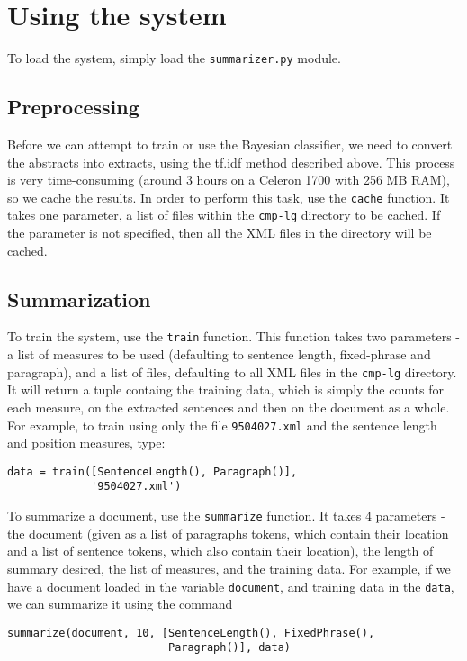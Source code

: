 \documentclass[a4paper, 10pt]{article}
\begin{document}
\section{Using the system}
To load the system, simply load the \verb|summarizer.py| module.

\subsection{Preprocessing}
Before we can attempt to train or use the Bayesian classifier, we need to convert the abstracts into extracts, using the tf.idf method described above. This process is very time-consuming (around 3 hours on a Celeron 1700 with 256 MB RAM), so we cache the results. In order to perform this task, use the \verb|cache| function. It takes one parameter, a list of files within the \verb|cmp-lg| directory to be cached. If the parameter is not specified, then all the XML files in the directory will be cached.

\subsection{Summarization}
To train the system, use the \verb|train| function. This function takes two parameters - a list of measures to be used (defaulting to sentence length, fixed-phrase and paragraph), and a list of files, defaulting to all XML files in the \verb|cmp-lg| directory. It will return a tuple containg the training data, which is simply the counts for each measure, on the extracted sentences and then on the document as a whole. For example, to train using only the file \verb|9504027.xml| and the sentence length and position measures, type:
\begin{verbatim} 
data = train([SentenceLength(), Paragraph()], 
             '9504027.xml') \end{verbatim}

To summarize a document, use the \verb|summarize| function. It takes 4 parameters - the document (given as a list of paragraphs tokens, which contain their location and a list of sentence tokens, which also contain their location), the length of summary desired, the list of measures, and the training data. For example, if we have a document loaded in the variable \verb|document|, and training data in the \verb|data|, we can summarize it using the command
\begin{verbatim} 
summarize(document, 10, [SentenceLength(), FixedPhrase(), 
                         Paragraph()], data) \end{verbatim}
\end{document}
